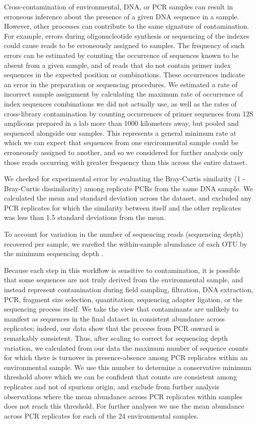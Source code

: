 \documentclass[11pt,letterpaper]{article} %
\begin{document}
Cross-contamination of environmental, DNA, or PCR samples can result in erroneous inference about the presence of a given DNA sequence in a sample. However, other processes can contribute to the same signature of contamination. For example, errors during oligonucleotide synthesis or sequencing of the indexes could cause reads to be erroneously assigned to samples. The frequency of such errors can be estimated by counting the occurrence of sequences known to be absent from a given sample, and of reads that do not contain primer index sequences in the expected position or combinations. These occurrences indicate an error in the preparation or sequencing procedures. We estimated a rate of incorrect sample assignment by calculating the maximum rate of occurrence of index sequences combinations we did not actually use, as well as the rates of cross-library contamination by counting occurrences of primer sequences from 12S amplicons prepared in a lab more than 1000 kilometers away, but pooled and sequenced alongside our samples. This represents a general minimum rate at which we can expect that sequences from one environmental sample could be erroneously assigned to another, and so we considered for further analysis only those reads occurring with greater frequency than this across the entire dataset.


We checked for experimental error by evaluating the Bray-Curtis similarity (1 - Bray-Curtis dissimilarity) among replicate PCRs from the same DNA sample. We calculated the mean and standard deviation across the dataset, and excluded any PCR replicates for which the similarity between itself and the other replicates was less than 1.5 standard deviations from the mean.


To account for variation in the number of sequencing reads (sequencing depth) recovered per sample, we rarefied the within-sample abundance of each OTU by the minimum sequencing depth \citep{vegan}.


Because each step in this workflow is sensitive to contamination, it is possible that some sequences are not truly derived from the environmental sample, and instead represent contamination during field sampling, filtration, DNA extraction, PCR, fragment size selection, quantitation, sequencing adapter ligation, or the sequencing process itself. We take the view that contaminants are unlikely to manifest as sequences in the final dataset in consistent abundance across replicates; indeed, our data show that the process from PCR onward is remarkably consistent. Thus, after scaling to correct for sequencing depth variation, we calculated from our data the maximum number of sequence counts for which there is turnover in presence-absence among PCR replicates within an environmental sample. We use this number to determine a conservative minimum threshold above which we can be confident that counts are consistent among replicates and not of spurious origin, and exclude from further analysis observations where the mean abundance across PCR replicates within samples does not reach this threshold. For further analyses we use the mean abundance across PCR replicates for each of the 24 environmental samples.
\end{document}
